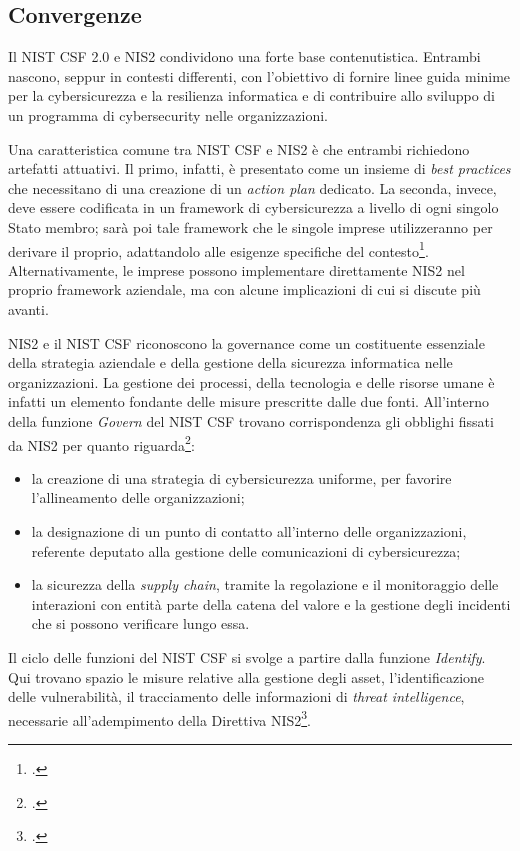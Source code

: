 \subsection{Convergenze}
Il NIST CSF 2.0 e NIS2 condividono una forte base contenutistica. Entrambi nascono, seppur in contesti differenti,
con l'obiettivo di fornire linee guida minime per la cybersicurezza e la resilienza informatica
e di contribuire allo sviluppo di un programma di cybersecurity nelle organizzazioni.

Una caratteristica comune tra NIST CSF e NIS2 è che entrambi richiedono artefatti attuativi. 
Il primo, infatti, è presentato come un insieme di \textit{best practices} che necessitano di una creazione
di un \textit{action plan} dedicato. La seconda, invece, deve essere codificata in un framework di cybersicurezza
a livello di ogni singolo Stato membro; sarà poi tale framework che le singole imprese utilizzeranno per derivare
il proprio, adattandolo alle esigenze specifiche del contesto\footcite{parmar-miles-csf}. Alternativamente, le imprese possono implementare
direttamente NIS2 nel proprio framework aziendale, ma con alcune implicazioni di cui si discute più avanti.

NIS2 e il NIST CSF riconoscono la governance come un costituente essenziale della strategia aziendale e della
gestione della sicurezza informatica nelle organizzazioni. La gestione dei processi, della tecnologia e delle 
risorse umane è infatti un elemento fondante delle misure prescritte dalle due fonti. All'interno della funzione
\textit{Govern} del NIST CSF trovano corrispondenza gli obblighi fissati da NIS2 per quanto riguarda\footcite[p. 4]{parmar-miles-csf}:
\begin{itemize}
    \item la creazione di una strategia di cybersicurezza uniforme, per favorire l'allineamento delle organizzazioni;
    \item la designazione di un punto di contatto all'interno delle organizzazioni, referente deputato alla gestione delle comunicazioni
    di cybersicurezza;
    \item la sicurezza della \textit{supply chain}, tramite la regolazione e il monitoraggio delle interazioni con entità parte 
    della catena del valore e la gestione degli incidenti che si possono verificare lungo essa.
\end{itemize}

Il ciclo delle funzioni del NIST CSF si svolge a partire dalla funzione \textit{Identify}. Qui trovano spazio le misure
relative alla gestione degli asset, l'identificazione delle vulnerabilità, il tracciamento delle informazioni di \textit{threat 
intelligence}, necessarie all'adempimento della Direttiva NIS2\footcite[p. 4]{parmar-miles-csf}.

